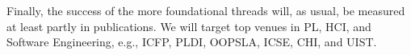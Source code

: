 
Finally, the
success of the more foundational threads will, as usual, be measured
at least partly in publications.  We will target top venues in PL,
HCI, and Software Engineering, e.g., ICFP, PLDI, OOPSLA, ICSE, CHI,
and UIST.  


\clearpage
